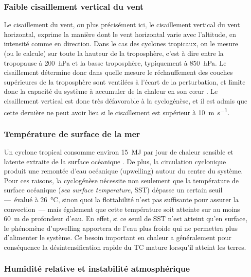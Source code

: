 \documentclass[../main.tex]{subfiles}
\begin{document}
\subsubsection{Faible cisaillement vertical du vent}

Le cisaillement du vent, ou plus précisément ici, le cisaillement vertical du vent horizontal, exprime la manière dont le vent horizontal varie avec l'altitude, en intensité comme en direction. Dans le cas des cyclones tropicaux, on le mesure (ou le calcule) sur toute la hauteur de la troposphère, c'est à dire entre la tropopause à \SI{200}{\hecto\pascal} et la basse troposphère, typiquement à \SI{850}{\hecto\pascal}. Le cisaillement détermine donc dans quelle mesure le réchauffement des
couches supérieures de la troposphère sont ventilées à l'écart de la perturbation, et limite donc la capacité du système à accumuler de la chaleur en son cœur \parencite{gray_tropical_1975}. Le cisaillement vertical est donc très défavorable à la cyclogénèse, et il est admis que cette dernière ne peut avoir lieu si le cisaillement est supérieur à \SI{10}{\metre\per\second}.

\subsubsection{Température de surface de la mer}

Un cyclone tropical consomme environ \SI{15}{\mega\joule} par jour de chaleur sensible et latente extraite de la surface océanique \parencite{gray_tropical_1975}. De plus, la circulation cyclonique produit une remontée d'eau océanique (upwelling) autour du centre du système. Pour ces raisons, la cyclogénèse nécessite non seulement que la température de surface océanique (\textit{sea surface temperature}, SST) dépasse un certain seuil ---~évalué à \SI{26}{\degreeCelsius}, sinon quoi la
flottabilité n'est pas suffisante pour assurer la convection~--- mais également que cette température soit atteinte sur au moins \SI{60}{\metre} de profondeur d'eau. En effet, si ce seuil de SST n'est atteint qu'en surface, le phénomène d'upwelling apportera de l'eau plus froide qui ne permettra plus d'alimenter le système. Ce besoin important en chaleur a généralement pour conséquence la désintensification rapide du TC mature lorsqu'il atteint les terres.

\subsubsection{Humidité relative et instabilité atmosphérique}
\end{document}
